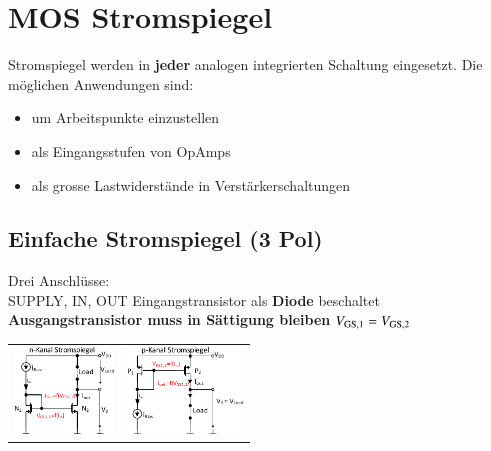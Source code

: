 \section{MOS Stromspiegel}

\begin{minipage}[t]{0.48\columnwidth}
    Stromspiegel werden in \textbf{jeder} analogen integrierten Schaltung eingesetzt.
    Die möglichen Anwendungen sind:
\end{minipage}
\hfill
\begin{minipage}[t]{0.48\columnwidth}
    \begin{itemize}
        \item um Arbeitspunkte einzustellen
        \item als Eingangsstufen von OpAmps
        \item als grosse Lastwiderstände in Verstärkerschaltungen
    \end{itemize}
\end{minipage}


\subsection{Einfache Stromspiegel (3 Pol)}

\begin{minipage}[c]{0.35\columnwidth}
    \raggedright
    \begin{outline}
        \1 Drei Anschlüsse: \\
            SUPPLY, IN, OUT
        \1 Eingangstransistor als \textbf{Diode} beschaltet
        \1 \textbf{Ausgangstransistor muss in Sättigung bleiben}
        \1 $V_{\rm GS,1} = V_{\rm GS,2}$
    \end{outline}
\end{minipage}
\hfill
\begin{minipage}[c]{0.64\columnwidth}
    \begin{tabular}{c c@{}}
        \includegraphics[height=2.3cm]{images/06_stormspiegel_nKanal.pdf} & 
        \includegraphics[height=2.3cm]{images/06_stormspiegel_pKanal.pdf}
    \end{tabular}
\end{minipage}


